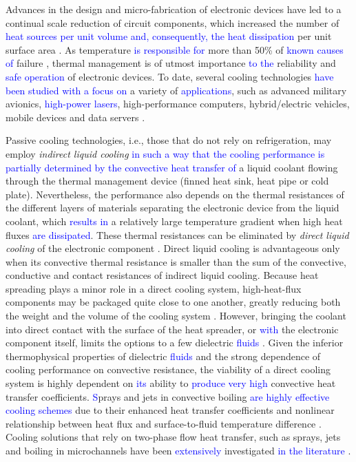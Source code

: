 \documentclass[review,preprint,12pt]{elsarticle}
\begin{document}
Advances in the design and micro-fabrication of electronic devices have led to a continual scale reduction of circuit components, which increased the number of \textcolor{blue}{heat sources per unit volume and, consequently, the heat dissipation} per unit surface area \cite{Bar-Cohen2014}. As temperature \textcolor{blue}{is responsible for} more than 50\% of \textcolor{blue}{known causes of} failure \cite{Anandan2008}, thermal management is of utmost importance \textcolor{blue}{to the} reliability and \textcolor{blue}{safe operation} of electronic devices. To date, several cooling technologies \textcolor{blue}{have been studied with a focus on} a variety of \textcolor{blue}{applications}, such as advanced military avionics, \textcolor{blue}{high-power lasers}, high-performance computers, hybrid/electric vehicles, mobile devices and data servers \cite{Mudawar2001,Chu2004,Nakayama2009,HangKabbani2015,KheirabadiGroulx2016}.

Passive cooling technologies, i.e., those that do not rely on refrigeration, may employ {\it indirect liquid cooling} \textcolor{blue}{in such a way that the cooling performance is partially determined by the convective heat transfer of} a liquid coolant flowing through the thermal management device (finned heat sink, heat pipe or cold plate). Nevertheless, the performance also depends on the thermal resistances of the different layers of materials separating the electronic device from the liquid coolant, which \textcolor{blue}{results in} a relatively large temperature gradient when high heat fluxes \textcolor{blue}{are dissipated}. These thermal resistances can be eliminated by {\it direct liquid cooling} of the electronic component \cite{Bar-Cohen2006}. Direct liquid cooling is advantageous only when its convective thermal resistance is smaller than the sum of the convective, conductive and contact resistances of  indirect liquid cooling. Because heat spreading plays a minor role in a direct cooling system, high-heat-flux components may be packaged quite close to one another, greatly reducing both the weight and the volume of the cooling system \cite{Mudawar2008}. However, bringing the coolant into direct contact with the surface of the heat spreader, or \textcolor{blue}{with} the electronic component itself, limits the options to a few dielectric \textcolor{blue}{fluids} \cite{Mudawar2008,Starke2005}. Given the inferior thermophysical properties of dielectric \textcolor{blue}{fluids} and the strong dependence of cooling performance on convective resistance, the viability of a direct cooling system is highly dependent on \textcolor{blue}{its} ability to \textcolor{blue}{produce very high} convective heat transfer coefficients. \textcolor{blue}{S}prays and jets in convective boiling \textcolor{blue}{are highly effective cooling schemes} due to their enhanced heat transfer coefficients and  nonlinear relationship between heat flux and surface-to-fluid temperature difference \cite{Sung2009a}. Cooling solutions that rely on two-phase flow heat transfer, such as sprays, jets and boiling in microchannels have been \textcolor{blue}{extensively} investigated \textcolor{blue}{in the literature} \cite{Bar-Cohen2006,Agostini2007,Kandlikar2007,Ebadian2011,Marcinichen2013,Kadam2014,Cheng2016,RiofrioCaneyGruss2016,SmakulskiPietrowicz2016}. 
\end{document}
